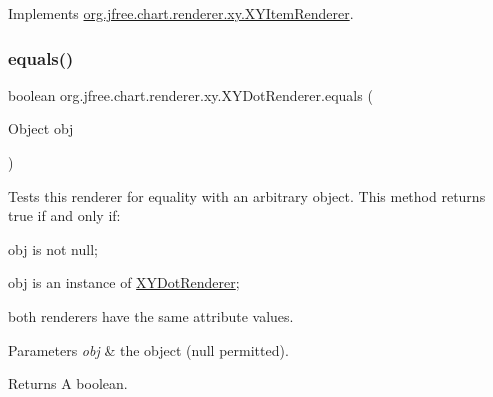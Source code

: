 Implements \mbox{\hyperlink{interfaceorg_1_1jfree_1_1chart_1_1renderer_1_1xy_1_1_x_y_item_renderer_ad867040a3ea09f5127596aacdd94586a}{org.\+jfree.\+chart.\+renderer.\+xy.\+X\+Y\+Item\+Renderer}}.

\mbox{\label{classorg_1_1jfree_1_1chart_1_1renderer_1_1xy_1_1_x_y_dot_renderer_ae1ae5293645c355b40cb8ab050f9fae8}} 
\subsubsection{\texorpdfstring{equals()}{equals()}}
{\footnotesize\ttfamily boolean org.\+jfree.\+chart.\+renderer.\+xy.\+X\+Y\+Dot\+Renderer.\+equals (\begin{DoxyParamCaption}\item[{Object}]{obj }\end{DoxyParamCaption})}

Tests this renderer for equality with an arbitrary object. This method returns {\ttfamily true} if and only if\+:


\begin{DoxyItemize}
\item {\ttfamily obj} is not {\ttfamily null}; 
\item {\ttfamily obj} is an instance of {\ttfamily \mbox{\hyperlink{classorg_1_1jfree_1_1chart_1_1renderer_1_1xy_1_1_x_y_dot_renderer}{X\+Y\+Dot\+Renderer}}}; 
\item both renderers have the same attribute values. 
\end{DoxyItemize}


\begin{DoxyParams}{Parameters}
{\em obj} & the object ({\ttfamily null} permitted).\\
\hline
\end{DoxyParams}
\begin{DoxyReturn}{Returns}
A boolean. 
\end{DoxyReturn}
\mbox{\label{classorg_1_1jfree_1_1chart_1_1renderer_1_1xy_1_1_x_y_dot_renderer_ab274478be9bf3d846732b90953e543b1}} 
